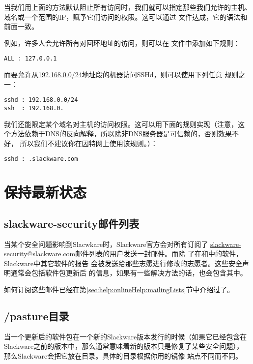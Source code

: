 当我们用上面的方法默认阻止所有访问时，我们就可以指定那些我们允许的主机、
域名或一个范围的IP，赋予它们访问的权限。这可以通过
文件达成，它的语法和前面一致。

例如，许多人会允许所有对回环地址的访问，则可以在
文件中添加如下规则：
\begin{Verbatim}[frame=single, commandchars=\\\{\}]
ALL : 127.0.0.1
\end{Verbatim}

而要允许从\url{192.168.0.0/24}地址段的机器访问SSHd，则可以使用下列任意
规则之一：
\begin{Verbatim}[frame=single, commandchars=\\\{\}]
sshd : 192.168.0.0/24
ssh  : 192.168.0.
\end{Verbatim}

我们还能限定某个域名对主机的访问权限。这可以用下面的规则实现（注意，这
个方法依赖于DNS的反向解释，所以除非DNS服务器是可信赖的，否则效果不好，
所以我们不建议你在因特网上使用该规则。）：
\begin{Verbatim}[frame=single, commandchars=\\\{\}]
sshd : .slackware.com
\end{Verbatim}

\section{保持最新状态}
\label{sec:security:keepingCurrent}

\subsection{slackware-security邮件列表}
\label{sec:security:keepingCurrent:mailingList}
当某个安全问题影响到Slacwkare时，Slackware官方会对所有订阅了
\url{slackware-security@slackware.com}邮件列表的用户发送一封邮件。而除
了在和中的软件，Slackware中其它软件的报告
会被发送给那些志愿进行修改的志愿者。这些安全声明通常会包括软件包更新后
的信息，如果有一些解决方法的话，也会包含其中。

如何订阅这些邮件已经在第\ref{sec:help:onlineHelp:mailingLists}节中介绍过了。

\subsection{/pasture目录}
\label{sec:security:keepingCurrent:pasture}
当一个更新后的软件包在一个新的Slackware版本发行的时候（如果它已经包含在
Slackware之前的版本中，那么通常意味着新的版本只是修复了某些安全问题），
那么Slackware会把它放在目录。具体的目录根据你用的镜像
站点不同而不同。

